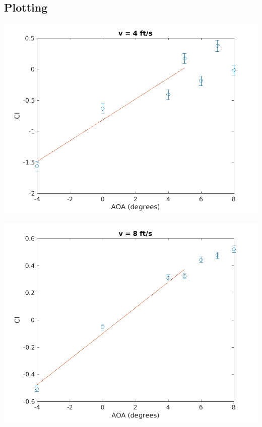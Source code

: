 \documentclass{article}
\begin{document}
\subsection*{Plotting}
\begin{minipage}{0.5\linewidth}
	\centering
	\includegraphics[width = \textwidth]{4plot.png}
\end{minipage}
\begin{minipage}{0.5\linewidth}
	\centering
	\includegraphics[width = \textwidth]{8plot.png}
\end{minipage}
\end{document}
